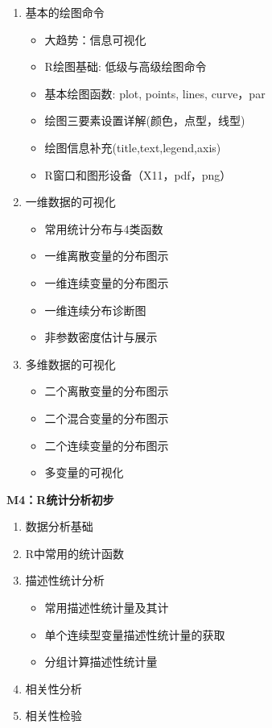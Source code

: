 \documentclass[12pt,hyperref,]{ctexart}
\providecommand{\tightlist}{%
  \setlength{\itemsep}{0pt}\setlength{\parskip}{0pt}}
\begin{document}
\begin{enumerate}
\def\labelenumi{\arabic{enumi}.}
\item
  基本的绘图命令

  \begin{itemize}
  \tightlist
  \item
    大趋势：信息可视化
  \item
    R绘图基础: 低级与高级绘图命令
  \item
    基本绘图函数: plot, points, lines, curve，par
  \item
    绘图三要素设置详解(颜色，点型，线型)
  \item
    绘图信息补充(title,text,legend,axis)
  \item
    R窗口和图形设备（X11，pdf，png）
  \end{itemize}
\item
  一维数据的可视化

  \begin{itemize}
  \tightlist
  \item
    常用统计分布与4类函数
  \item
    一维离散变量的分布图示
  \item
    一维连续变量的分布图示
  \item
    一维连续分布诊断图
  \item
    非参数密度估计与展示
  \end{itemize}
\item
  多维数据的可视化

  \begin{itemize}
  \tightlist
  \item
    二个离散变量的分布图示
  \item
    二个混合变量的分布图示
  \item
    二个连续变量的分布图示
  \item
    多变量的可视化
  \end{itemize}
\end{enumerate}

\textbf{M4：R统计分析初步}

\begin{enumerate}
\def\labelenumi{\arabic{enumi}.}
\item
  数据分析基础
\item
  R中常用的统计函数
\item
  描述性统计分析

  \begin{itemize}
  \tightlist
  \item
    常用描述性统计量及其计
  \item
    单个连续型变量描述性统计量的获取
  \item
    分组计算描述性统计量
  \end{itemize}
\item
  相关性分析
\item
  相关性检验
\end{enumerate}
\end{document}

